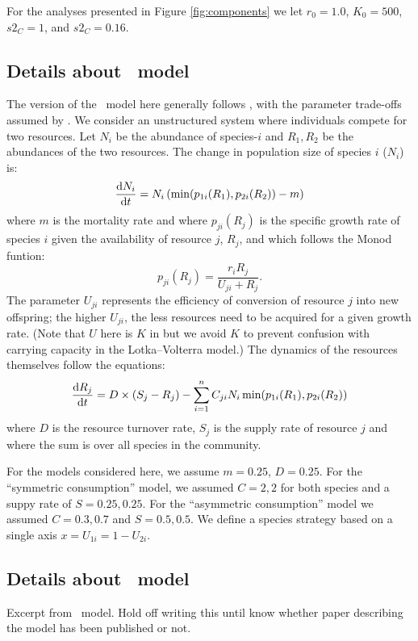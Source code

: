\documentclass[a4paper,11pt]{article}
\begin{document}
For the analyses presented in Figure \ref{fig:components} we let $r_0=1.0$, $K_0=500$,
 $s2_C=1$, and $s2_C=0.16$.

\subsection{Details about \Rstar\ model}\label{sec:Rstar}

The version of the \Rstar\ model here generally follows
\citet{Huisman-2001}, with the parameter trade-offs assumed by
\citet{Fox-2008}.
%
We consider an unstructured system where individuals compete for two
resources. Let $N_i$ be the abundance of species-$i$ and $R_1, R_2$ be
the abundances of the two resources.
%
The change in population size of species $i$ ($N_i$) is:
\begin{equation}
  \label{eq:rstar-n}
  \frac{\mathrm{d} N_i}{\mathrm{d} t} = N_i \, (\min(p_{1i}(R_1), p_{2i}(R_2)) - m)
\end{equation}
where $m$ is the mortality rate and where $p_{ji}(R_j)$ is the
specific growth rate of species $i$ given the availability of resource
$j$, $R_j$, and which follows the Monod funtion:
\begin{equation}
  \label{eq:rstar-p}
  p_{ji}(R_j) = \frac{r_i R_j}{U_{ji} + R_j}.
\end{equation}
%
The parameter $U_{ji}$ represents the efficiency of conversion of
resource $j$ into new offspring; the higher $U_{ji}$, the less
resources need to be acquired for a given growth rate.  (Note that $U$
here is $K$ in \citealt{Huisman-2001} but we avoid $K$ to prevent
confusion with carrying capacity in the Lotka--Volterra model.)
%
The dynamics of the resources themselves follow the equations:
\begin{equation}
  \label{eq:rstar-r}
  \frac{\mathrm{d} R_j}{\mathrm{d} t} =
  D \times (S_j - R_j) - \sum_{i=1}^n {C_{ji} N_i
    \min(p_{1i}(R_1), p_{2i}(R_2))}
\end{equation}
where $D$ is the resource turnover rate, $S_j$ is the supply rate of
resource $j$ and where the sum is over all species in the community.


For the models considered here, we assume $m = 0.25$, $D=0.25$.
%
For the ``symmetric consumption'' model, we assumed $C = {2, 2}$
for both species and a suppy rate of  $S = {0.25, 0.25}$.  For the
``asymmetric consumption'' model we assumed $C = {0.3, 0.7}$ and
$S = {0.5, 0.5}$.  We define a species strategy based on a single axis
$x = U_{1i} = 1 - U_{2i}$.

\subsection{Details about \plant\ model}\label{sec:plant}

Excerpt from  \plant\ model. Hold off writing this until know whether paper describing
the model has been published or not.
\end{document}
